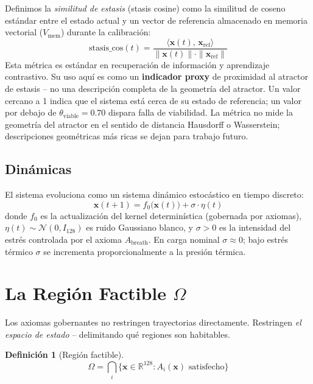 \documentclass[11pt, a4paper]{article}
\newtheorem{definition}{Definición}
\newcommand{\R}{\mathbb{R}}
\newcommand{\sv}{\bm{x}}
\begin{document}
Definimos la \emph{similitud de estasis} (stasis cosine) como la similitud de coseno estándar entre
el estado actual y un vector de referencia almacenado en memoria vectorial ($V_\text{mem}$)
durante la calibración:
\begin{equation}
  \text{stasis\_cos}(t)
    = \frac{\langle \sv(t),\, \sv_\text{ref} \rangle}
           {\|\sv(t)\| \cdot \|\sv_\text{ref}\|}
  \label{eq:stasis_cos}
\end{equation}
Esta métrica es estándar en recuperación de información y aprendizaje contrastivo.
Su uso aquí es como un \textbf{indicador proxy} de proximidad al atractor
de estasis -- no una descripción completa de la geometría del atractor.
Un valor cercano a 1 indica que el sistema está cerca de su estado de referencia;
un valor por debajo de $\theta_\text{viable} = 0.70$ dispara falla de viabilidad.
La métrica no mide la geometría del atractor en el sentido de distancia Hausdorff o
Wasserstein; descripciones geométricas más ricas se dejan para trabajo futuro.

\subsection{Dinámicas}

El sistema evoluciona como un sistema dinámico estocástico en tiempo discreto:
\begin{equation}
  \sv(t+1) = f_0\bigl(\sv(t)\bigr) + \sigma \cdot \eta(t)
\label{eq:dynamics}
\end{equation}
donde $f_0$ es la actualización del kernel determinística (gobernada por axiomas),
$\eta(t) \sim \mathcal{N}(0, I_{128})$ es ruido Gaussiano blanco,
y $\sigma > 0$ es la intensidad del estrés controlada por el axioma $A_\text{breath}$.
En carga nominal $\sigma \approx 0$; bajo estrés térmico $\sigma$
se incrementa proporcionalmente a la presión térmica.


\section{La Región Factible $\Omega$}
\label{sec:feasible}

Los axiomas gobernantes no restringen trayectorias directamente.
Restringen \emph{el espacio de estado} -- delimitando qué regiones son habitables.

\begin{definition}[Región factible]
\label{def:omega}
\begin{equation}
  \Omega = \bigcap_i \bigl\{ \sv \in \R^{128} : A_i(\sv) \text{ satisfecho} \bigr\}
\end{equation}
\end{definition}
\end{document}
